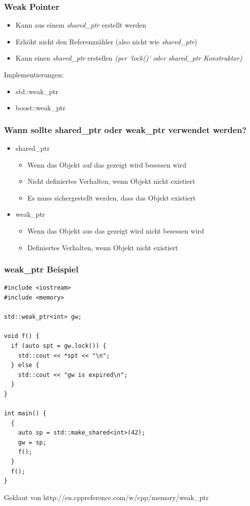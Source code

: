 \documentclass{beamer}
\begin{document}
\begin{frame}[fragile]
 \frametitle{Weak Pointer}
 \begin{itemize}
  \item Kann aus einem \textit{shared\_ptr} erstellt werden
  \item Erhöht nicht den Referenzzähler (also nicht wie \textit{shared\_ptr})
  \item Kann einen \textit{shared\_ptr} erstellen \textit{(per `lock()` oder shared\_ptr Konstruktor)}
 \end{itemize}
 Implementierungen:
 \begin{itemize}
 	\item std::weak\_ptr
 	\item boost::weak\_ptr
 \end{itemize}
\end{frame}

\begin{frame}
 \frametitle{Wann sollte shared\_ptr oder weak\_ptr verwendet werden?}
 \begin{itemize}
  \item shared\_ptr
  \begin{itemize}
   \item Wenn das Objekt auf das gezeigt wird besessen wird
   \item Nicht definiertes Verhalten, wenn Objekt nicht existiert
   \item Es muss sichergestellt werden, dass das Objekt existiert
  \end{itemize}
  \item weak\_ptr
  \begin{itemize}
   \item Wenn das Objekt aus das gezeigt wird nicht besessen wird
   \item Definiertes Verhalten, wenn Objekt nicht existiert
  \end{itemize}
 \end{itemize}
\end{frame}

\begin{frame}[fragile]
 \frametitle{weak\_ptr Beispiel}
 \begin{lstlisting}
#include <iostream>
#include <memory>

std::weak_ptr<int> gw;

void f() {
  if (auto spt = gw.lock()) {
	std::cout << *spt << "\n";
  } else {
    std::cout << "gw is expired\n";
  }
}

int main() {
  {
    auto sp = std::make_shared<int>(42);
  	gw = sp;
  	f();
  }
  f();
}
 \end{lstlisting}
 \tiny Geklaut von http://en.cppreference.com/w/cpp/memory/weak\_ptr
\end{frame}
\end{document}
